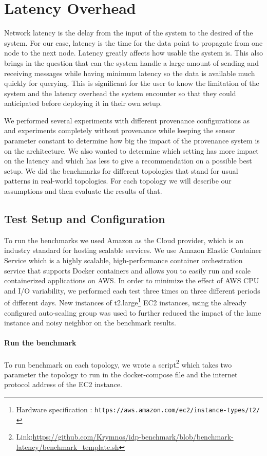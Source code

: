 \section{Latency Overhead}

Network latency is the delay from the input of the system to the desired of the system. For our case, latency is the time for the data point to propagate from one node to the next node. Latency greatly affects how usable the system is. This also brings in the question that can the system handle a large amount of sending and receiving messages while having minimum latency so the data is available much quickly for querying. This is significant for the user to know the limitation of the system and the latency overhead the system encounter so that they could anticipated before deploying it in their own setup.


We performed several experiments with different provenance configurations as and experiments completely without provenance while keeping the sensor parameter constant to determine how big the impact of the provenance system is on the architecture. We also wanted to determine which setting has more impact on the latency and which has less to give a recommendation on a possible best setup. We did the benchmarks for different topologies that stand for usual patterns in real-world topologies. For each topology we will describe our assumptions and then evaluate the results of that.

\subsection{Test Setup and Configuration} \label{testsetup}
To run the benchmarks we used Amazon as the Cloud provider, which is an industry standard for hosting scalable services. We use Amazon Elastic Container Service which is a highly scalable, high-performance container orchestration service that supports Docker containers and allows you to easily run and scale containerized applications on AWS. In order to minimize the effect of AWS CPU and I/O variability, we performed each test three times on three different periods of different days.  New instances of t2.large\footnote{Hardware specification : \texttt{https://aws.amazon.com/ec2/instance-types/t2/} } EC2 instances, using the already configured auto-scaling group  was used to further reduced the impact of the lame instance and noisy neighbor on the benchmark results. 


\paragraph*{Run the benchmark}
To run benchmark on each topology, we wrote a script\footnote{Link:\url{https://github.com/Krymnos/idp-benchmark/blob/benchmark-latency/benchmark_template.sh} } which takes two parameter the topology to run in the docker-compose file and the internet protocol address of the EC2 instance.

